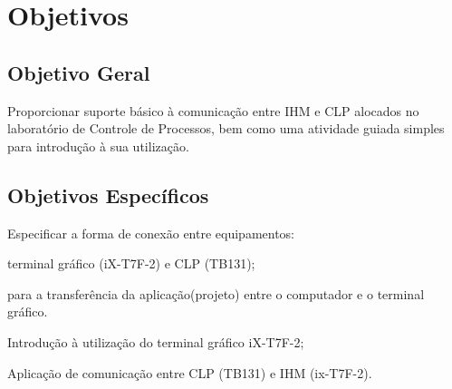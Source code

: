 \section{Objetivos}
\label{sec:objetivos}


\subsection{Objetivo Geral}
\label{sec:objetivo-geral}

Proporcionar suporte básico à comunicação entre \acrshort{IHM} e \acrshort{CLP} alocados no laboratório de Controle de Processos, bem como uma atividade guiada simples para introdução à sua utilização.




\subsection{Objetivos Específicos}
\label{sec:objetivos-especificos}


	\begin{alineas}
		\item Especificar a forma de conexão entre equipamentos:
			\begin{alineas}
			\item terminal gráfico (iX-T7F-2) e \acrshort{CLP} (\acrshort{TB}131);
			\item para a transferência da aplicação(projeto) entre o computador e o terminal gráfico.
			\end{alineas}
		\item Introdução à utilização do terminal gráfico iX-T7F-2;
		\item Aplicação de comunicação entre \acrshort{CLP} (\acrshort{TB}131) e \acrshort{IHM} (ix-T7F-2).
	\end{alineas}
